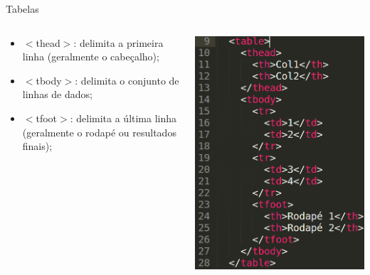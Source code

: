 \documentclass{beamer}
\begin{document}
\begin{frame}{Tabelas}
    \begin{columns}
    \begin{column}{0.5 \textwidth}
      \small
     \begin{itemize}
      \item $<$thead$>$: delimita a primeira linha (geralmente o 
cabeçalho);
       \item $<$tbody$>$: delimita o conjunto de linhas de dados;
       \item $<$tfoot$>$: delimita a última linha (geralmente o rodapé ou 
resultados finais);
     \end{itemize}
    \end{column}
    
    \begin{column}{0.5\textwidth}
     \includegraphics[height=0.6\paperheight]{fig/aula2/aula4_4.png}
    \end{column}
  \end{columns}
\end{frame}
\end{document}

